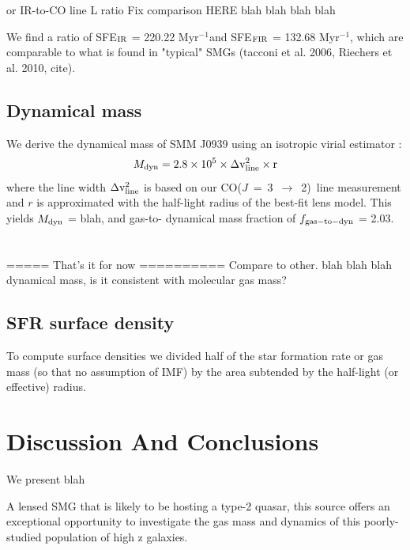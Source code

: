 \documentclass{emulateapj}
\newcommand{\Lsun}{\mbox{L$_{\odot}$}}
\newcommand{\CO}{\mbox{CO($J$ = 3 $\rightarrow$ 2) }}
\newcommand{\eg}{{\sl e.g.,~}}
\newcommand{\pmOne}{$^{-1}$}
\begin{document}
or IR-to-CO line L ratio
Fix comparison HERE blah blah blah blah

We find a ratio of SFE$_{\rm IR}$ = 220.22 Myr\pmOne and SFE$_{\rm FIR}$ = 132.68 Myr\pmOne, which are comparable
to what is found in "typical" SMGs (tacconi et al. 2006, Riechers et al. 2010, cite).

\subsection{Dynamical mass} %
We derive the dynamical mass of SMM J0939 using an isotropic virial estimator \citep[\eg][]{Engel10a}:
\begin{equation}
M_{\rm dyn} = 2.8\times 10^5 \times \Delta \rm v_{\rm line}^ 2 \times r
\end{equation}
where the line width $\Delta \rm v_{\rm line}^ 2$ is based on our \CO line
measurement and $r$ is approximated with the half-light radius of the best-fit lens model. This yields $M_{\rm dyn}$ = blah, and gas-to-
dynamical mass fraction of $f_{\rm gas-to-dyn}$ = 2.03.\\ \\ 

\\ ===== That's it for now ==========
Compare to other. blah blah blah dynamical mass, is it consistent with molecular gas mass?

\subsection{SFR surface density}
To compute surface densities we divided half of the star formation rate or gas mass (so that no assumption of IMF) by the area subtended by the half-light (or effective) radius.


\section{Discussion And Conclusions} \label{sec:conclusions}
We present blah

A lensed SMG that is likely to be hosting a type-2 quasar, this source offers an exceptional opportunity to
investigate the gas mass and dynamics of this
poorly-studied population of high z galaxies.
\end{document}
